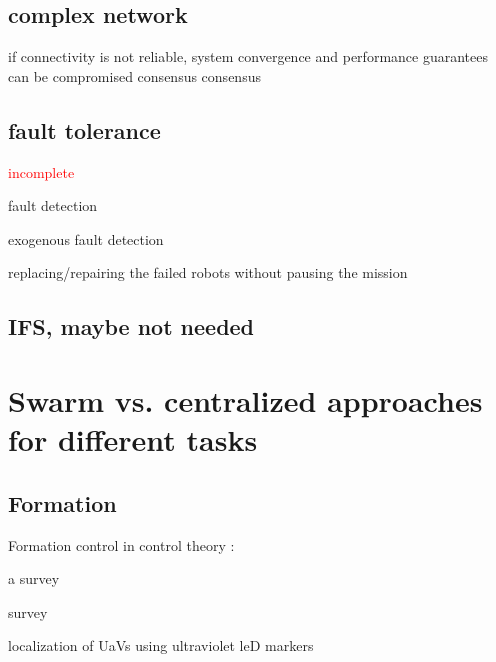 \subsection{complex network}
\cite{kirst2016dynamic}
\cite{zavlanos2011graph}

if connectivity is not reliable, system convergence and performance guarantees can be compromised
\cite{cortes2008distributed} consensus
\cite{de2006decentralized}
\cite{moreau2005stability}
\cite{olfati2007consensus} consensus

\subsection{fault tolerance}
\cite{bjerknes2013fault}
\cite{tarapore2017generic}
\cite{winfield2006safety}
\cite{strobel2018managing} \textcolor{red}{incomplete}
\cite{pini2011task}
\cite{o2023predictive}
\cite{oladiran2019fault}

fault detection
\cite{tarapore2019fault}
\cite{khaldi2017monitoring}

exogenous fault detection
\cite{khadidos2015exogenous}
\cite{millard2016exogenous}
\cite{millard2013towards}

replacing/repairing the failed robots without pausing the mission
\cite{christensen2009fireflies}
\cite{varadharajan2020swarm}

\subsection{IFS, maybe not needed}
\cite{edition2000authoritative}
\cite{zhou2019review}
\cite{niu2021distributed}
\cite{sheng2021intermittent}
\cite{zhang2021intermittent}
\cite{syed2016novel}


\section{Swarm vs. centralized approaches for different tasks}

\subsection{Formation}

Formation control in control theory :

\cite{liu2018survey} a survey

\cite{oh2015survey} survey

\cite{walter2018fast} localization of UaVs using ultraviolet 
leD markers

